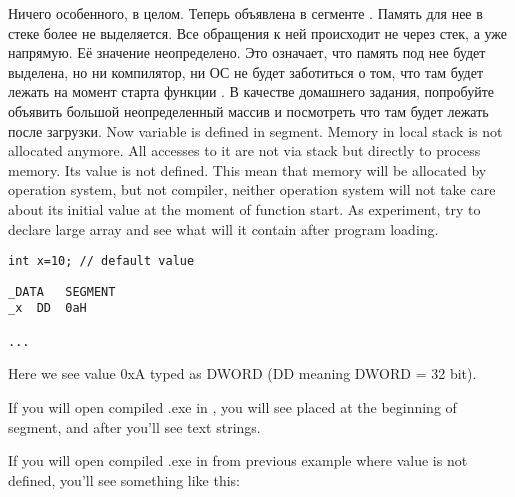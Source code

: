 

\IFRU
{Ничего особенного, в целом. Теперь  объявлена в сегменте . 
Память для нее в стеке более не выделяется. Все обращения к ней происходит не через стек, а уже напрямую. 
Её значение неопределено. 
Это означает, что память под нее будет выделена, но ни компилятор, ни ОС не будет заботиться о том, 
что там будет лежать на момент старта функции .
В качестве домашнего задания, попробуйте объявить большой неопределенный массив и посмотреть 
что там будет лежать после загрузки.}
{Now  variable is defined in  segment. 
Memory in local stack is not allocated anymore. 
All accesses to it are not via stack but directly to process memory. 
Its value is not defined. 
This mean that memory will be allocated by operation system, but not compiler, 
neither operation system will not take care about its initial value at the moment of 
\main function start.
As experiment, try to declare large array and see what will it contain after 
program loading.}


\begin{lstlisting}
int x=10; // default value
\end{lstlisting}


\begin{lstlisting}
_DATA	SEGMENT
_x	DD	0aH

...
\end{lstlisting}

{Here we see value 0xA typed as DWORD (DD meaning DWORD = 32 bit).}

{If you will open compiled .exe in \IDA, you will see  placed at the beginning of 
 segment, and after you'll see text strings.}

{If you will open compiled .exe in \IDA from previous example where  value is not defined, 
you'll see something like this:}

